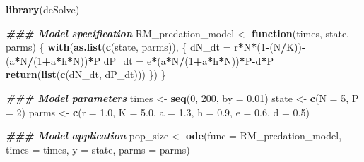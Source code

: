 \documentclass[
]{book}
\newenvironment{Shaded}{\begin{snugshade}}{\end{snugshade}}
\newcommand{\AttributeTok}[1]{\textcolor[rgb]{0.13,0.29,0.53}{#1}}
\newcommand{\ControlFlowTok}[1]{\textcolor[rgb]{0.13,0.29,0.53}{\textbf{#1}}}
\newcommand{\DecValTok}[1]{\textcolor[rgb]{0.00,0.00,0.81}{#1}}
\newcommand{\DocumentationTok}[1]{\textcolor[rgb]{0.56,0.35,0.01}{\textbf{\textit{#1}}}}
\newcommand{\FloatTok}[1]{\textcolor[rgb]{0.00,0.00,0.81}{#1}}
\newcommand{\FunctionTok}[1]{\textcolor[rgb]{0.13,0.29,0.53}{\textbf{#1}}}
\newcommand{\NormalTok}[1]{#1}
\newcommand{\OtherTok}[1]{\textcolor[rgb]{0.56,0.35,0.01}{#1}}
\newcommand{\SpecialCharTok}[1]{\textcolor[rgb]{0.81,0.36,0.00}{\textbf{#1}}}
\begin{document}
\begin{Shaded}
\begin{Highlighting}[]
\FunctionTok{library}\NormalTok{(deSolve)}

\DocumentationTok{\#\#\# Model specification}
\NormalTok{RM\_predation\_model }\OtherTok{\textless{}{-}} \ControlFlowTok{function}\NormalTok{(times, state, parms) \{}
  \FunctionTok{with}\NormalTok{(}\FunctionTok{as.list}\NormalTok{(}\FunctionTok{c}\NormalTok{(state, parms)), \{}
\NormalTok{    dN\_dt }\OtherTok{=}\NormalTok{ r}\SpecialCharTok{*}\NormalTok{N}\SpecialCharTok{*}\NormalTok{(}\DecValTok{1}\SpecialCharTok{{-}}\NormalTok{(N}\SpecialCharTok{/}\NormalTok{K))}\SpecialCharTok{{-}}\NormalTok{(a}\SpecialCharTok{*}\NormalTok{N}\SpecialCharTok{/}\NormalTok{(}\DecValTok{1}\SpecialCharTok{+}\NormalTok{a}\SpecialCharTok{*}\NormalTok{h}\SpecialCharTok{*}\NormalTok{N))}\SpecialCharTok{*}\NormalTok{P}
\NormalTok{    dP\_dt }\OtherTok{=}\NormalTok{ e}\SpecialCharTok{*}\NormalTok{(a}\SpecialCharTok{*}\NormalTok{N}\SpecialCharTok{/}\NormalTok{(}\DecValTok{1}\SpecialCharTok{+}\NormalTok{a}\SpecialCharTok{*}\NormalTok{h}\SpecialCharTok{*}\NormalTok{N))}\SpecialCharTok{*}\NormalTok{P}\SpecialCharTok{{-}}\NormalTok{d}\SpecialCharTok{*}\NormalTok{P}
    \FunctionTok{return}\NormalTok{(}\FunctionTok{list}\NormalTok{(}\FunctionTok{c}\NormalTok{(dN\_dt, dP\_dt)))  }
\NormalTok{  \})}
\NormalTok{\}}

\DocumentationTok{\#\#\# Model parameters}
\NormalTok{times }\OtherTok{\textless{}{-}} \FunctionTok{seq}\NormalTok{(}\DecValTok{0}\NormalTok{, }\DecValTok{200}\NormalTok{, }\AttributeTok{by =} \FloatTok{0.01}\NormalTok{)  }
\NormalTok{state }\OtherTok{\textless{}{-}} \FunctionTok{c}\NormalTok{(}\AttributeTok{N =} \DecValTok{5}\NormalTok{, }\AttributeTok{P =} \DecValTok{2}\NormalTok{)  }
\NormalTok{parms }\OtherTok{\textless{}{-}} \FunctionTok{c}\NormalTok{(}\AttributeTok{r =} \FloatTok{1.0}\NormalTok{, }\AttributeTok{K =} \FloatTok{5.0}\NormalTok{, }\AttributeTok{a =} \FloatTok{1.3}\NormalTok{, }\AttributeTok{h =} \FloatTok{0.9}\NormalTok{, }\AttributeTok{e =} \FloatTok{0.6}\NormalTok{, }\AttributeTok{d =} \FloatTok{0.5}\NormalTok{) }

\DocumentationTok{\#\#\# Model application}
\NormalTok{pop\_size }\OtherTok{\textless{}{-}} \FunctionTok{ode}\NormalTok{(}\AttributeTok{func =}\NormalTok{ RM\_predation\_model, }\AttributeTok{times =}\NormalTok{ times, }\AttributeTok{y =}\NormalTok{ state, }\AttributeTok{parms =}\NormalTok{ parms)}


\end{Highlighting}
\end{Shaded}
\end{document}
